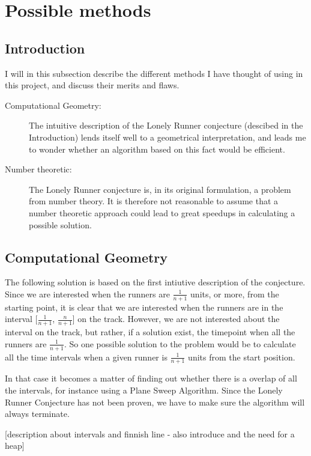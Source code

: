 \section{Possible methods}
\label{choiceOfMethod}

\subsection{Introduction}
I will in this subsection describe the different methods I have thought of using in this project, and discuss their merits and flaws.

\begin{description}
\item[Computational Geometry:] The intuitive description of the Lonely Runner conjecture (descibed in the Introduction) lends itself well to a geometrical interpretation, and leads me to wonder whether an algorithm based on this fact would be efficient.

\item[Number theoretic:] The Lonely Runner conjecture is, in its original formulation, a problem from number theory. It is therefore not reasonable to assume that a number theoretic approach could lead to great speedups in calculating a possible solution.
\end{description}

\subsection{Computational Geometry}
The following solution is based on the first intiutive description of the conjecture. Since we are interested when the runners are $\frac{1}{n + 1}$ units, or more, from the starting point, it is clear that we are interested when the runners are in the interval [$\frac{1}{n + 1}$, $\frac{n}{n + 1}$] on the track. However, we are not interested about the interval on the track, but rather, if a solution exist, the timepoint when all the runners are $\frac{1}{n+1}$. So one possible solution to the problem would be to calculate all the time intervals when a given runner is $\frac{1}{n+1}$ units from the start position. 

In that case it becomes a matter of finding out whether there is a overlap of all the intervals, for instance using a Plane Sweep Algorithm. Since the Lonely Runner Conjecture has not been proven, we have to make sure the algorithm will always terminate.  

[description about intervals and finnish line - also introduce and the need for a heap]

